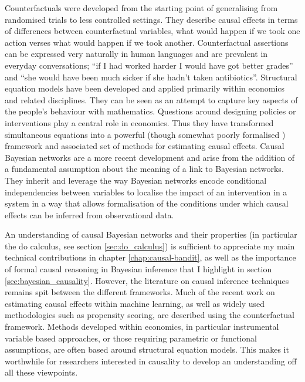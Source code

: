 \documentclass[11pt,a4paper,twoside]{report}
\newcommand{\quotes}[1]{``#1''}
\theoremstyle{plain}
\theoremstyle{definition}
\begin{document}
Counterfactuals \citep{Rubin1974} were developed from the starting point of generalising from randomised trials to less controlled settings. They describe causal effects in terms of differences between counterfactual variables, what would happen if we took one action verses what would happen if we took another. Counterfactual assertions can be expressed very naturally in human languages and are  prevalent in  everyday conversations; \quotes{if I had worked harder I would have got better grades} and \quotes{she would have been much sicker if she hadn't taken antibiotics}. Structural equation models have been developed and applied primarily within economics and related disciplines. They can be seen as an attempt to capture key aspects of the people's behaviour with mathematics. Questions around designing policies or interventions play a central role in economics. Thus they have transformed simultaneous equations into a powerful (though somewhat poorly formalised \citep{Pearl2000}) framework and associated set of methods for estimating causal effects. Causal Bayesian networks \citep{Pearl2000} are a more recent development and arise from the addition of a fundamental assumption about the meaning of a link to Bayesian networks. They inherit and leverage the way Bayesian networks encode conditional independencies between variables to localise the impact of an intervention in a system in a way that allows formalisation of the conditions under which causal effects can be inferred from observational data. 

An understanding of causal Bayesian networks and their properties (in particular the do calculus, see section \ref{sec:do_calculus}) is sufficient to appreciate my main technical contributions in chapter \ref{chap:causal-bandit}, as well as the importance of formal causal reasoning in Bayesian inference that I highlight in section  \ref{sec:bayesian_causality}. However, the literature on causal inference techniques remains spit between the different frameworks. Much of the recent work on estimating causal effects within machine learning, as well as widely used methodologies such as propensity scoring, are described using the counterfactual framework. Methods developed within economics, in particular instrumental variable based approaches, or those requiring parametric or functional assumptions, are often based around structural equation models. This makes it worthwhile for researchers interested in causality to develop an understanding off all these viewpoints.
\end{document}
